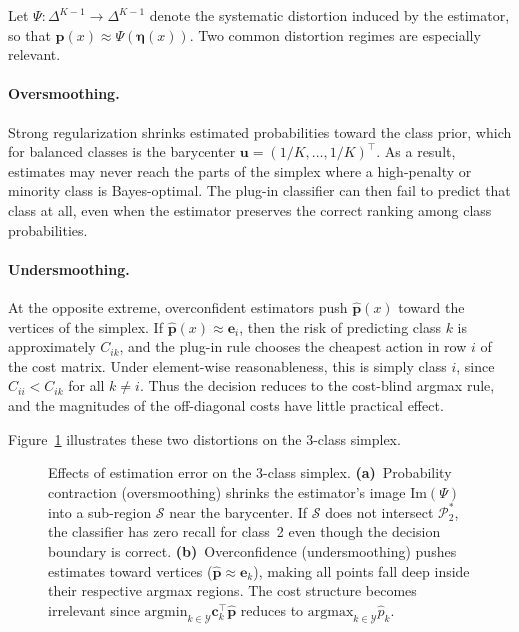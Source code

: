 Let $\Psi: \Delta^{K-1} \to \Delta^{K-1}$ denote the systematic distortion induced by the estimator, so that
$\hat{\mathbf{p}}(x) \approx \Psi(\boldsymbol{\eta}(x))$. Two common distortion regimes are especially relevant.

\paragraph{Oversmoothing.}
Strong regularization shrinks estimated probabilities toward the class prior, which for balanced classes is the barycenter
$\mathbf{u} = (1/K,\ldots,1/K)^\top$. As a result, estimates may never reach the parts of the simplex where a high-penalty or minority class is Bayes-optimal. The plug-in classifier can then fail to predict that class at all, even when the estimator preserves the correct ranking among class probabilities.

\paragraph{Undersmoothing.}
At the opposite extreme, overconfident estimators push $\hat{\mathbf{p}}(x)$ toward the vertices of the simplex. If $\hat{\mathbf{p}}(x) \approx \mathbf{e}_i$, then the risk of predicting class $k$ is approximately $C_{ik}$, and the plug-in rule chooses the cheapest action in row $i$ of the cost matrix. Under element-wise reasonableness, this is simply class $i$, since $C_{ii} < C_{ik}$ for all $k \neq i$. Thus the decision reduces to the cost-blind argmax rule, and the magnitudes of the off-diagonal costs have little practical effect.

Figure~\ref{fig:simplex_distortions} illustrates these two distortions on the 3-class simplex.

\begin{figure}[H]
    \centering
    \resizebox{\textwidth}{!}{}
    \caption{Effects of estimation error on the 3-class simplex. \textbf{(a)}~Probability contraction (oversmoothing) shrinks the estimator's image $\mathrm{Im}(\Psi)$ into a sub-region $\mathcal{S}$ near the barycenter. If $\mathcal{S}$ does not intersect $\mathcal{P}_2^*$, the classifier has zero recall for class~2 even though the decision boundary is correct. \textbf{(b)}~Overconfidence (undersmoothing) pushes estimates toward vertices ($\hat{\mathbf{p}} \approx \mathbf{e}_k$), making all points fall deep inside their respective argmax regions. The cost structure becomes irrelevant since $\mathrm{argmin}_{k \in \mathcal{Y}} \mathbf{c}_k^\top \hat{\mathbf{p}}$ reduces to $\mathrm{argmax}_{k \in \mathcal{Y}} \hat{p}_k$.}\label{fig:simplex_distortions}
\end{figure}

